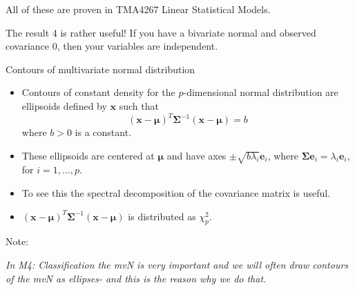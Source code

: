 \documentclass[ignorenonframetext,]{beamer}
\begin{document}
\begin{frame}

All of these are proven in TMA4267 Linear Statistical Models.

The result 4 is rather useful! If you have a bivariate normal and
observed covariance 0, then your variables are independent.

\end{frame}

\begin{frame}

\begin{block}{Contours of multivariate normal distribution}

\vspace{2mm}

\begin{itemize}
\item
  Contours of constant density for the \(p\)-dimensional normal
  distribution are ellipsoids defined by \(\mathbf{x}\) such that
  \[ (\mathbf{x}-\mathbf{\mu})^T\mathbf\Sigma^{-1}(\mathbf{x}-\mathbf{\mu})=b \]
  where \(b>0\) is a constant.
\item
  These ellipsoids are centered at \(\mathbf{\mu}\) and have axes
  \(\pm \sqrt{b \lambda_i}\mathbf{e}_i\), where
  \(\mathbf\Sigma\mathbf{e}_i=\lambda_i \mathbf{e}_i\), for
  \(i=1,...,p\).
\item
  To see this the spectral decomposition of the covariance matrix is
  useful.
\item
  \((\mathbf{x}-\mathbf{\mu})^T\mathbf\Sigma^{-1}(\mathbf{x}-\mathbf{\mu})\)
  is distributed as \(\chi^2_p\).
\end{itemize}

\end{block}

\end{frame}

\begin{frame}

Note:

\emph{In M4: Classification the mvN is very important and we will often
draw contours of the mvN as ellipses- and this is the reason why we do
that. }

\end{frame}
\end{document}
